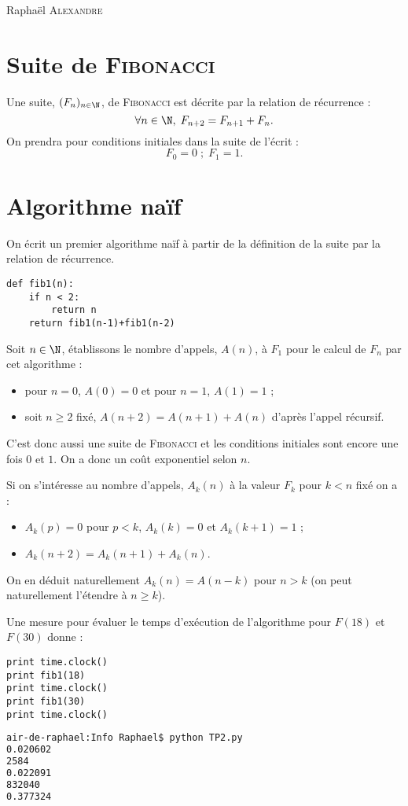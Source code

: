 \documentclass{mybourbaki}
\author{Raphaël Alexandre}
\begin{document}
\begin{center}
Raphaël \textsc{Alexandre}
\end{center}

\bigbreak
\bigbreak

\section*{Suite de \textsc{Fibonacci}}

Une suite, $(F_n)_{n\in \N}$, de \textsc{Fibonacci} est décrite par la relation de récurrence : \[ \forall n \in \N, \; F_{n+2} = F_{n+1} + F_n.\]
On prendra pour conditions initiales dans la suite de l'écrit : \[ F_0 = 0 \; ; \;  F_1 = 1.\]

\section{Algorithme naïf}
On écrit un premier algorithme naïf à partir de la définition de la suite par la relation de récurrence.

\begin{lstlisting}[frame=single] 
def fib1(n):
	if n < 2:
		return n
	return fib1(n-1)+fib1(n-2) 
\end{lstlisting}

Soit $n\in \N$, établissons le nombre d'appels, $A(n)$, à $F_1$ pour le calcul de $F_n$ par cet algorithme :
\begin{itemize}
\item pour $n=0$, $A(0) = 0$ et pour $n=1$, $A(1) = 1$ ;
\item soit $n\geq 2$ fixé, $A(n+2) = A(n+1) + A(n)$ d'après l'appel récursif.
\end{itemize}
C'est donc aussi une suite de \textsc{Fibonacci} et les conditions initiales sont encore une fois $0$ et $1$. On a donc un coût exponentiel selon $n$.

Si on s'intéresse au nombre d'appels, $A_k(n)$ à la valeur $F_k$ pour $k<n$ fixé on a :
\begin{itemize}
\item $A_k(p) = 0$ pour $p<k$, $A_k(k) = 0$ et $A_k(k+1) = 1$ ;
\item $A_k(n+2) = A_k(n+1) + A_k(n)$.
\end{itemize}
On en déduit naturellement $A_k(n) = A(n-k)$ pour $n>k$ (on peut naturellement l'étendre à $n\geq k$).

Une mesure pour évaluer le temps d'exécution de l'algorithme pour $F(18)$ et $F(30)$ donne :
\begin{lstlisting}[frame = single]
print time.clock()
print fib1(18)
print time.clock()
print fib1(30)
print time.clock()
\end{lstlisting}
\begin{lstlisting}[frame=single,language=bash]
air-de-raphael:Info Raphael$ python TP2.py
0.020602
2584
0.022091
832040
0.377324
\end{lstlisting}
\end{document}

